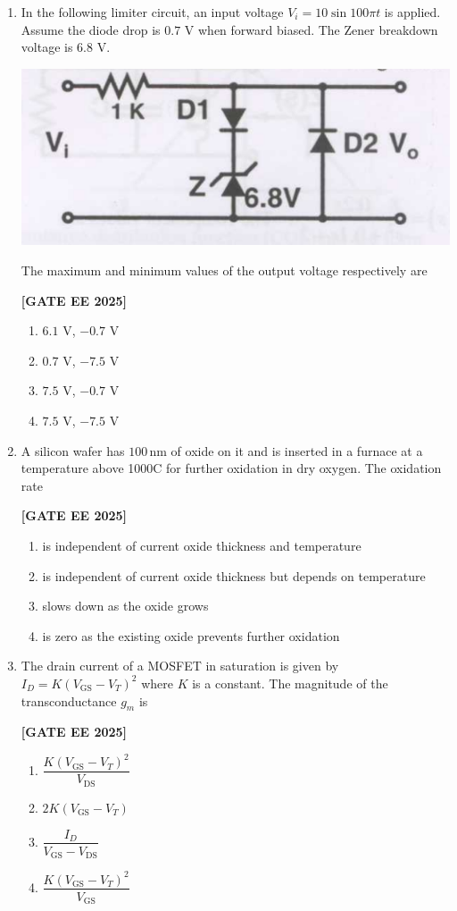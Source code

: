 \documentclass[12pt]{article}
\begin{document}
\begin{enumerate}[leftmargin=2.5em, label=\textbf{Q.\arabic*}., itemsep=2em]
\item In the following limiter circuit, an input voltage $V_i=10\sin100\pi t$ is applied. Assume the diode drop is $0.7$ V when forward biased. The Zener breakdown voltage is $6.8$ V.
\begin{center}
\includegraphics[width=0.7\columnwidth]{figs/q17.png}
\end{center}

The maximum and minimum values of the output voltage respectively are
 
\noindent \textbf{[GATE EE 2025]}
\begin{enumerate}
  \item $6.1$ V, $-0.7$ V
  \item $0.7$ V, $-7.5$ V
  \item $7.5$ V, $-0.7$ V
  \item $7.5$ V, $-7.5$ V
\end{enumerate}

\item A silicon wafer has $100\,\mathrm{nm}$ of oxide on it and is inserted in a furnace at a temperature above 1000\degree C for further oxidation in dry oxygen. The oxidation rate
 
\noindent \textbf{[GATE EE 2025]}
\begin{enumerate}
  \item is independent of current oxide thickness and temperature
  \item is independent of current oxide thickness but depends on temperature
  \item slows down as the oxide grows
  \item is zero as the existing oxide prevents further oxidation
\end{enumerate}

\item The drain current of a MOSFET in saturation is given by $I_D=K(V_{\mathrm{GS}}-V_T)^2$ where $K$ is a constant.
The magnitude of the transconductance $g_m$ is
 
\noindent \textbf{[GATE EE 2025]}
\begin{enumerate}
  \item $\dfrac{K(V_{\mathrm{GS}}-V_T)^2}{V_{\mathrm{DS}}}$
  \item $2K(V_{\mathrm{GS}}-V_T)$
  \item $\dfrac{I_D}{V_{\mathrm{GS}}-V_{\mathrm{DS}}}$
  \item $\dfrac{K(V_{\mathrm{GS}}-V_T)^2}{V_{\mathrm{GS}}}$
\end{enumerate}


\end{enumerate}
\end{document}
